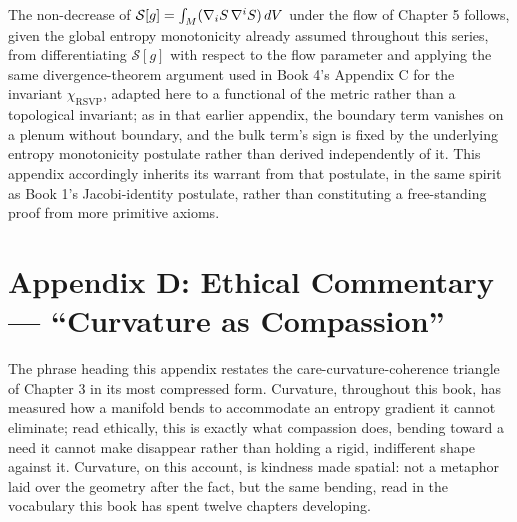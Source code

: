 The non-decrease of $\mathcal{S}[g] = \int_M (\nabla_i S \, \nabla^i S)\, dV$ under the flow of Chapter 5 follows, given the global entropy monotonicity already assumed throughout this series, from differentiating $\mathcal{S}[g]$ with respect to the flow parameter and applying the same divergence-theorem argument used in Book 4's Appendix C for the invariant $\chi_{\mathrm{RSVP}}$, adapted here to a functional of the metric rather than a topological invariant; as in that earlier appendix, the boundary term vanishes on a plenum without boundary, and the bulk term's sign is fixed by the underlying entropy monotonicity postulate rather than derived independently of it. This appendix accordingly inherits its warrant from that postulate, in the same spirit as Book 1's Jacobi-identity postulate, rather than constituting a free-standing proof from more primitive axioms.

\chapter*{Appendix D: Ethical Commentary --- ``Curvature as Compassion''}

The phrase heading this appendix restates the care-curvature-coherence triangle of Chapter 3 in its most compressed form. Curvature, throughout this book, has measured how a manifold bends to accommodate an entropy gradient it cannot eliminate; read ethically, this is exactly what compassion does, bending toward a need it cannot make disappear rather than holding a rigid, indifferent shape against it. Curvature, on this account, is kindness made spatial: not a metaphor laid over the geometry after the fact, but the same bending, read in the vocabulary this book has spent twelve chapters developing.
